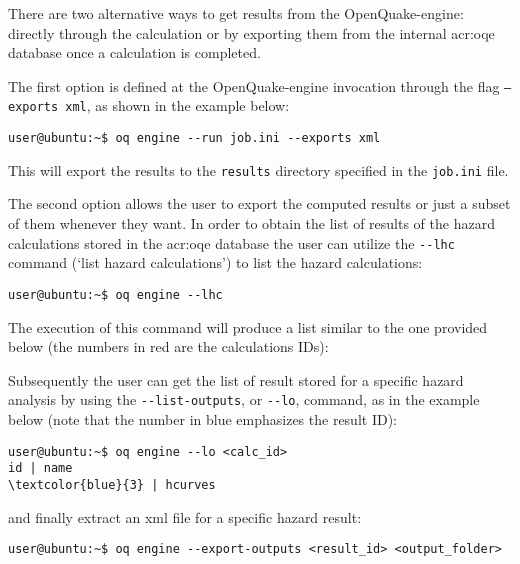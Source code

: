 There are two alternative ways to get results from the OpenQuake-engine:
directly through the calculation or by exporting them from the internal
\gls{acr:oqe} database once a calculation is completed.

The first option is defined at the OpenQuake-engine invocation through the flag \texttt{--exports xml}, as shown in the example below:

\begin{verbatim}
user@ubuntu:~$ oq engine --run job.ini --exports xml
\end{verbatim}

This will export the results to the \verb=results= directory specified in the \verb=job.ini= file. 

The second option allows the user to export the computed results or just a subset of them whenever they want. In order to obtain the list of results of the hazard calculations stored in the \gls{acr:oqe} database the user can utilize the \texttt{-{}-lhc} command (`list hazard calculations') to list the hazard calculations:

\begin{verbatim}
user@ubuntu:~$ oq engine --lhc
\end{verbatim}

The execution of this command will produce a list similar to the one provided
below (the numbers in red are the calculations IDs):



Subsequently the user can get the list of result stored for a specific hazard
analysis by using the \texttt{-{}-list-outputs}, or \texttt{-{}-lo}, command, as in the example below (note that the number in blue emphasizes the
result ID):

\begin{Verbatim}[frame=single, commandchars=\\\{\}, fontsize=\small]
user@ubuntu:~$ oq engine --lo <calc_id>
id | name
\textcolor{blue}{3} | hcurves
\end{Verbatim}

and finally extract an xml file for a specific hazard result:

\begin{Verbatim}[frame=single, commandchars=\\\{\}, fontsize=\small]
user@ubuntu:~$ oq engine --export-outputs <result_id> <output_folder>
\end{Verbatim}



